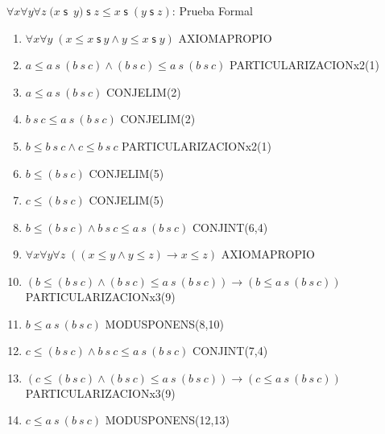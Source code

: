 \documentclass[10pt]{beamer}
\newcounter{saveenumi}
\newcommand{\seti}{\setcounter{saveenumi}{\value{enumi}}}
\newcommand{\Cfonta}{\fontsize{6.7}{9.5}\selectfont}
\newcommand{\Nand}{\wedge}
\newcommand{\trans}{\forall x\forall y\forall z\;\left( (x\leq y\wedge
y\leq z)\rightarrow x\leq z\right)}
\newcommand{\sCot}{\forall x\forall y\;(x\leq x\;\mathsf{s}\ y\wedge y\leq x\;\mathsf{s}\;y)}
\newcommand{\assoc}{\forall x\forall y\forall
z\;(x\;\mathsf{s}$\ $y)\;\mathsf{s}\;z\leq x\;\mathsf{s}\;(y\;\mathsf{s}\;z)}
\begin{document}
\begin{frame}{$\assoc$: Prueba Formal}
\Cfonta
  \begin{enumerate}[<+->]
    \item $ \sCot $ \hfill AXIOMAPROPIO
    \item $ a \leq a\ s\ (b\ s\ c)\Nand (b\ s\ c)\leq a\ s\ (b\ s\ c) $ \hfill PARTICULARIZACIONx2(1)
    \item $ a \leq a\ s\ (b\ s\ c)$ \hfill CONJELIM(2)
    \item $ b\ s\ c \leq a\ s\ (b\ s\ c)$ \hfill CONJELIM(2)
    \item $ b \leq b\ s\ c \Nand c \leq b\ s\ c $ \hfill PARTICULARIZACIONx2(1)
    \item $ b \leq (b\ s\ c)$ \hfill CONJELIM(5)
    \item $ c \leq (b\ s\ c)$ \hfill CONJELIM(5)
    \item $ b \leq (b\ s\ c) \Nand b\ s\ c \leq a\ s\ (b\ s\ c)$ \hfill CONJINT(6,4)
    \item $ \trans $ \hfill AXIOMAPROPIO
    \item $ (b \leq (b\ s\ c) \Nand (b\ s\ c) \leq a\ s\ (b\ s\ c)) \rightarrow (b \leq a\ s\ (b\ s\ c))$ \hfill PARTICULARIZACIONx3(9)
    \item $ b \leq a\ s\ (b\ s\ c) $ \hfill MODUSPONENS(8,10)
    \item $ c \leq (b\ s\ c) \Nand  b\ s\ c \leq a\ s\ (b\ s\ c) $ \hfill CONJINT(7,4)
    \item $ (c \leq (b\ s\ c) \Nand (b\ s\ c) \leq a\ s\ (b\ s\ c)) \rightarrow (c \leq a\ s\ (b\ s\ c))$ \hfill PARTICULARIZACIONx3(9)
    \item $ c \leq a\ s\ (b\ s\ c) $ \hfill MODUSPONENS(12,13)
    \seti
  \end{enumerate}


  \setcounter{equation}{0}

\end{frame}
\end{document}
